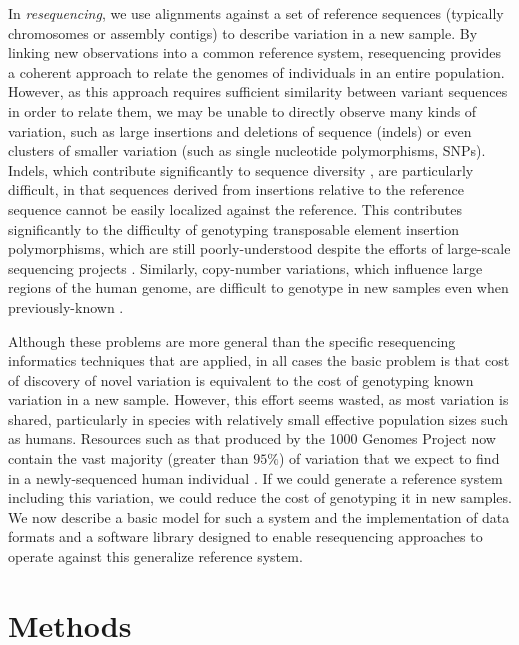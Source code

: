 \documentclass{article}
\begin{document}
In \emph{resequencing}, we use alignments against a set of reference sequences (typically chromosomes or assembly contigs) to describe variation in a new sample. By linking new observations into a common reference system, resequencing provides a coherent approach to relate the genomes of individuals in an entire population. However, as this approach requires sufficient similarity between variant sequences in order to relate them, we may be unable to directly observe many kinds of variation, such as large insertions and deletions of sequence (indels) or even clusters of smaller variation (such as single nucleotide polymorphisms, SNPs). Indels, which contribute significantly to sequence diversity \cite{mills2010}, are particularly difficult, in that sequences derived from insertions relative to the reference sequence cannot be easily localized against the reference. This contributes significantly to the difficulty of genotyping transposable element insertion polymorphisms, which are still poorly-understood despite the efforts of large-scale sequencing projects \cite{stewart2011}. Similarly, copy-number variations, which influence large regions of the human genome, are difficult to genotype in new samples even when previously-known \cite{sudmant2010}.

Although these problems are more general than the specific resequencing informatics techniques that are applied, in all cases the basic problem is that cost of discovery of novel variation is equivalent to the cost of genotyping known variation in a new sample. However, this effort seems wasted, as most variation is shared, particularly in species with relatively small effective population sizes such as humans. Resources such as that produced by the 1000 Genomes Project now contain the vast majority (greater than $95\%$) of variation that we expect to find in a newly-sequenced human individual \cite{1000Gphase1}. If we could generate a reference system including this variation, we could reduce the cost of genotyping it in new samples. We now describe a basic model for such a system and the implementation of data formats and a software library designed to enable resequencing approaches to operate against this generalize reference system.

\section{Methods}
\end{document}
